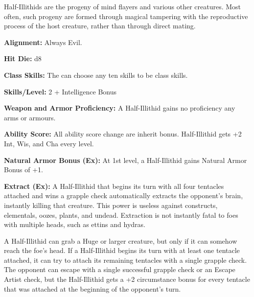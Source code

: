 
Half-Illithids are the progeny of mind flayers and various other creatures. Most often, such progeny are formed through magical tampering with the reproductive process of the host creature, rather than through direct mating.

\textbf{Alignment:} Always Evil.

\textbf{Hit Die:} d8

\textbf{Class Skills:} The \currentclassname{} can choose any ten skills to be class skills.

\textbf{Skills/Level:} 2 + Intelligence Bonus

\modebab{}
\poorfor{}
\poorref{}
\goodwil{}

\begin{classtable}
\end{classtable}

\classfeatures

\textbf{Weapon and Armor Proficiency:} A Half-Illithid gains no proficiency any arms or armours.

\textbf{Ability Score:} All ability score change are inherit bonus. Half-Illithid gets +2 Int, Wis, and Cha every level.
 
\textbf{Natural Armor Bonus (Ex):} At 1st level, a Half-Illithid gains Natural Armor Bonus of +1.
 
 \textbf{Extract (Ex):} A Half-Illithid that begins its turn with all four tentacles attached and wins a grapple check automatically extracts the opponent’s brain, instantly killing that creature.
This power is useless against constructs, elementals, oozes, plants, and undead. Extraction is not instantly fatal to foes with multiple heads, such as ettins and hydras.

A Half-Illithid can grab a Huge or larger creature, but only if it can somehow reach the foe’s head. If a Half-Illithid begins its turn with at least one tentacle attached, it can try to attach its remaining tentacles with a single grapple check. The opponent can escape with a single successful grapple check or an Escape Artist check, but the Half-Illithid gets a +2 circumstance bonus for every tentacle that was attached at the beginning of the opponent’s turn.

